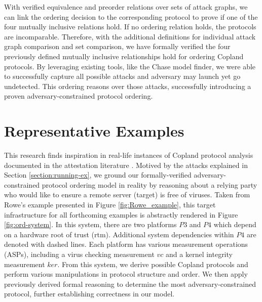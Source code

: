 \documentclass[runningheads]{llncs}
\theoremstyle{definition}
\begin{document}
With verified equivalence and preorder relations over sets of attack graphs, we can link the ordering decision to the corresponding protocol to prove if one of the four mutually inclusive relations hold. If no ordering relation holds, the protocols are incomparable. Therefore, with the additional definitions for individual attack graph comparison and set comparison, we have formally verified the four previously defined mutually inclusive relationships hold for ordering Copland protocols. By leveraging existing tools, like the Chase model finder, we were able to successfully capture all possible attacks and adversary may launch yet go undetected. This ordering reasons over those attacks, successfully introducing a proven adversary-constrained protocol ordering. 

\section{Representative Examples}


This research finds inspiration in real-life instances of Copland protocol analysis documented in the attestation literature \cite{Rowe:2021:OnOrdering,Coker::Principles-of-R}. Motived by the attacks explained in Section \ref{section:running-ex}, we ground our formally-verified adversary-constrained protocol ordering model in reality by reasoning about a relying party who would like to ensure a remote server (target) is free of viruses. Taken from Rowe's \cite{Rowe:2016:Confining} example presented in Figure \ref{fig:Rowe_example}, this target infrastructure for all forthcoming examples is abstractly rendered in Figure \ref{fig:ord-system}. In this system, there are two platforms $P3$ and $P4$ which depend on a hardware root of trust (rtm). Additional system dependencies within $P4$ are denoted with dashed lines.  Each platform has various measurement operations (ASPs), including a virus checking measurement $vc$ and a kernel integrity measurement $ker$. From this system, we derive possible Copland protocols and perform various manipulations in protocol structure and order. We then apply previously derived formal reasoning to determine the most adversary-constrained protocol, further establishing correctness in our model.

\end{document}
